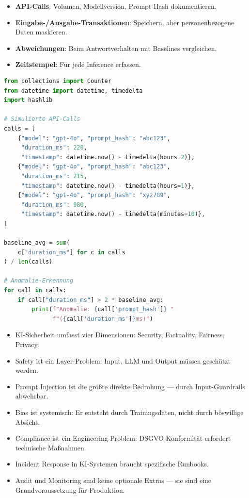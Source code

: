 \begin{itemize}[leftmargin=*]
     \item \textbf{API-Calls}: Volumen, Modellversion, Prompt-Hash dokumentieren.
     \item \textbf{Eingabe-/Ausgabe-Transaktionen}: Speichern, aber personenbezogene Daten maskieren.
     \item \textbf{Abweichungen}: Beim Antwortverhalten mit Baselines vergleichen.
     \item \textbf{Zeitstempel}: Für jede Inference erfassen.
\end{itemize}

\begin{lstlisting}[language=Python, caption={AI-Forensik: strukturierte Log-Auswertung}, label=lst:ai-forensics]
from collections import Counter
from datetime import datetime, timedelta
import hashlib

# Simulierte API-Calls
calls = [
    {"model": "gpt-4o", "prompt_hash": "abc123",
     "duration_ms": 220,
     "timestamp": datetime.now() - timedelta(hours=2)},
    {"model": "gpt-4o", "prompt_hash": "abc123",
     "duration_ms": 215,
     "timestamp": datetime.now() - timedelta(hours=1)},
    {"model": "gpt-4o", "prompt_hash": "xyz789",
     "duration_ms": 980,
     "timestamp": datetime.now() - timedelta(minutes=10)},
]

baseline_avg = sum(
    c["duration_ms"] for c in calls
) / len(calls)

# Anomalie-Erkennung
for call in calls:
    if call["duration_ms"] > 2 * baseline_avg:
        print(f"Anomalie: {call['prompt_hash']} "
              f"({call['duration_ms']}ms)")
\end{lstlisting}

\begin{zusammenfassungEnv}
\begin{itemize}[leftmargin=*]
     \item KI-Sicherheit umfasst vier Dimensionen: Security, Factuality, Fairness, Privacy.
     \item Safety ist ein Layer-Problem: Input, LLM und Output müssen geschützt werden.
     \item Prompt Injection ist die größte direkte Bedrohung --- durch Input-Guardrails abwehrbar.
     \item Bias ist systemisch: Er entsteht durch Trainingsdaten, nicht durch böswillige Absicht.
     \item Compliance ist ein Engineering-Problem: DSGVO-Konformität erfordert technische Maßnahmen.
     \item Incident Response in KI-Systemen braucht spezifische Runbooks.
     \item Audit und Monitoring sind keine optionale Extras --- sie sind eine Grundvoraussetzung für Produktion.
\end{itemize}
\end{zusammenfassungEnv}

